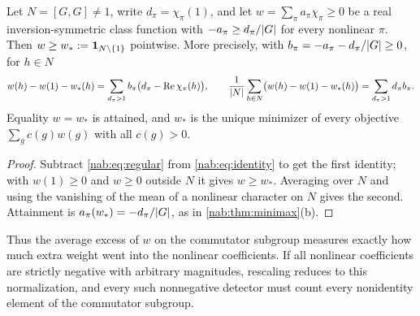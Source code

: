 \begin{proposition}\label{nab:prop:least}
Let $N=[G,G]\ne1$, write $d_\pi=\chi_\pi(1)$, and let $w=\sum_\pi a_\pi\chi_\pi\ge0$ be a
real inversion-symmetric class function with $-a_\pi\ge d_\pi/\lvert G\rvert$ for every nonlinear
$\pi$. Then $w\ge w_*:=\mathbf{1}_{N\setminus\{1\}}$ pointwise. More precisely, with
$b_\pi=-a_\pi-d_\pi/\lvert G\rvert\ge0$, for $h\in N$
\[
 w(h)-w(1)-w_*(h)=\sum_{d_\pi>1}b_\pi\bigl(d_\pi-\operatorname{Re}\chi_\pi(h)\bigr),\qquad
 \frac1{\lvert N\rvert}\sum_{h\in N}\bigl(w(h)-w(1)-w_*(h)\bigr)=\sum_{d_\pi>1}d_\pi b_\pi .
\]
Equality $w=w_*$ is attained, and $w_*$ is the unique minimizer of every objective
$\sum_gc(g)w(g)$ with all $c(g)>0$.
\end{proposition}
\begin{proof}
Subtract \eqref{nab:eq:regular} from \eqref{nab:eq:identity} to get the first identity;
with $w(1)\ge0$ and $w\ge0$ outside $N$ it gives $w\ge w_*$. Averaging over $N$ and using
the vanishing of the mean of a nonlinear character on $N$ gives the second. Attainment is
$a_\pi(w_*)=-d_\pi/\lvert G\rvert$, as in \cref{nab:thm:minimax}(b).
\end{proof}

Thus the average excess of $w$ on the commutator subgroup measures exactly how much extra
weight went into the nonlinear coefficients. If all nonlinear coefficients are strictly
negative with arbitrary magnitudes, rescaling reduces to this normalization, and every
such nonnegative detector must count every nonidentity element of the commutator subgroup.

